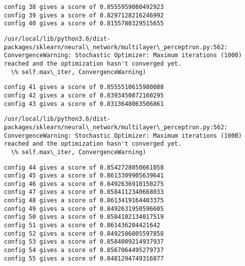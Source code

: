 \documentclass[11pt]{article}
\begin{document}
    \begin{Verbatim}[commandchars=\\\{\}]
config 38 gives a score of 0.8555959080492923
config 39 gives a score of 0.8297128216246992
config 40 gives a score of 0.8155780329515655

    \end{Verbatim}

    \begin{Verbatim}[commandchars=\\\{\}]
/usr/local/lib/python3.6/dist-packages/sklearn/neural\_network/multilayer\_perceptron.py:562: ConvergenceWarning: Stochastic Optimizer: Maximum iterations (1000) reached and the optimization hasn't converged yet.
  \% self.max\_iter, ConvergenceWarning)

    \end{Verbatim}

    \begin{Verbatim}[commandchars=\\\{\}]
config 41 gives a score of 0.8555510615980088
config 42 gives a score of 0.8393450872160295
config 43 gives a score of 0.8313648063506861

    \end{Verbatim}

    \begin{Verbatim}[commandchars=\\\{\}]
/usr/local/lib/python3.6/dist-packages/sklearn/neural\_network/multilayer\_perceptron.py:562: ConvergenceWarning: Stochastic Optimizer: Maximum iterations (1000) reached and the optimization hasn't converged yet.
  \% self.max\_iter, ConvergenceWarning)

    \end{Verbatim}

    \begin{Verbatim}[commandchars=\\\{\}]
config 44 gives a score of 0.8542728050661058
config 45 gives a score of 0.8613309905639641
config 46 gives a score of 0.8492636910150275
config 47 gives a score of 0.8584112340668033
config 48 gives a score of 0.8613419164403375
config 49 gives a score of 0.8492631950596605
config 50 gives a score of 0.8584102134017519
config 51 gives a score of 0.861436204421642
config 52 gives a score of 0.8492586805597858
config 53 gives a score of 0.8584009214937937
config 54 gives a score of 0.8567064495279737
config 55 gives a score of 0.8481294749316877

    \end{Verbatim}
\end{document}
